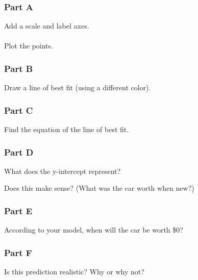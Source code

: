 \documentclass[12pt]{article}
\begin{document}
			\subsubsection*{Part A}
			
				Add a scale and label axes.\\\\
				Plot the points.

				\vspace{8cm}

			\subsubsection*{Part B}
			
				Draw a line of best fit (using a different color).

				\newpage

			\subsubsection*{Part C}
			
				Find the equation of the line of best fit.

				\vspace{4cm}

			\subsubsection*{Part D}
			
				What does the y-intercept represent?

				\vspace{2cm}

				Does this make sense? (What was the car worth when new?)

				\vspace{2cm}

			\subsubsection*{Part E}
			
				According to your model, when will the car be worth \$0?

				\vspace{3cm}

			\subsubsection*{Part F}
			
				Is this prediction realistic? Why or why not?
\end{document}
